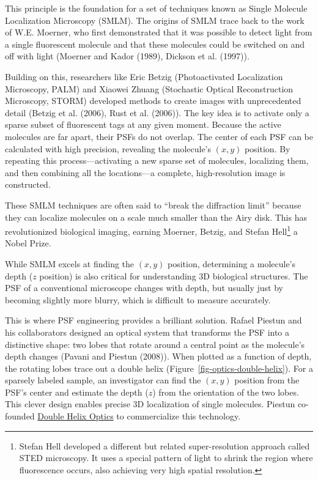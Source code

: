 \documentclass[
  letterpaper,
]{book}
\begin{document}
This principle is the foundation for a set of techniques known as Single
Molecule Localization Microscopy (SMLM). The origins of SMLM trace back
to the work of W.E. Moerner, who first demonstrated that it was possible
to detect light from a single fluorescent molecule and that these
molecules could be switched on and off with light (Moerner and Kador
(1989), Dickson et al. (1997)).

Building on this, researchers like Eric Betzig (Photoactivated
Localization Microscopy, PALM) and Xiaowei Zhuang (Stochastic Optical
Reconstruction Microscopy, STORM) developed methods to create images
with unprecedented detail (Betzig et al. (2006), Rust et al. (2006)).
The key idea is to activate only a sparse subset of fluorescent tags at
any given moment. Because the active molecules are far apart, their PSFs
do not overlap. The center of each PSF can be calculated with high
precision, revealing the molecule's \((x, y)\) position. By repeating
this process---activating a new sparse set of molecules, localizing
them, and then combining all the locations---a complete, high-resolution
image is constructed.

These SMLM techniques are often said to ``break the diffraction limit''
because they can localize molecules on a scale much smaller than the
Airy disk. This has revolutionized biological imaging, earning Moerner,
Betzig, and Stefan Hell\footnote{Stefan Hell developed a different but
  related super-resolution approach called STED microscopy. It uses a
  special pattern of light to shrink the region where fluorescence
  occurs, also achieving very high spatial resolution.} a Nobel Prize.

While SMLM excels at finding the \((x, y)\) position, determining a
molecule's depth (\(z\) position) is also critical for understanding 3D
biological structures. The PSF of a conventional microscope changes with
depth, but usually just by becoming slightly more blurry, which is
difficult to measure accurately.

This is where PSF engineering provides a brilliant solution. Rafael
Piestun and his collaborators designed an optical system that transforms
the PSF into a distinctive shape: two lobes that rotate around a central
point as the molecule's depth changes (Pavani and Piestun (2008)). When
plotted as a function of depth, the rotating lobes trace out a double
helix (Figure~\ref{fig-optics-double-helix}). For a sparsely labeled
sample, an investigator can find the \((x, y)\) position from the PSF's
center and estimate the depth (\(z\)) from the orientation of the two
lobes. This clever design enables precise 3D localization of single
molecules. Piestun co-founded
\href{https://www.doublehelixoptics.com/}{Double Helix Optics} to
commercialize this technology.
\end{document}
